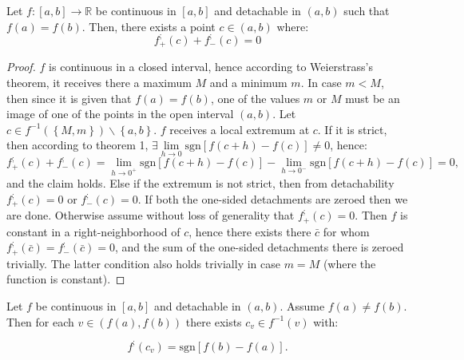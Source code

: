 \documentclass[11pt]{book}
\begin{document}
\begin{theorem}Let $f:\left[a,b\right]\rightarrow\mathbb{R}$ be continuous in $\left[a,b\right]$ and detachable in $\left(a,b\right)$ such that $f\left(a\right)=f\left(b\right).$ Then, there exists a point $c\in\left(a,b\right)$ where:
$$f_{+}^{;}\left(c\right)+f_{-}^{;}\left(c\right)=0$$
\label{rolle_theorem_detachment}
\end{theorem}
\begin{proof}$f$ is continuous in a closed interval, hence according to Weierstrass’s theorem, it receives there a maximum $M$ and a minimum $m$. In case $m < M$, then since it is given that $f\left(a\right)=f\left(b\right)$, one of the values $m$ or $M$ must be an image of one of the points in the open interval $\left(a,b\right)$. Let $c\in f^{-1}\left(\left\{ M,m\right\} \right)\backslash\left\{ a,b\right\}$. $f$ receives a local extremum at $c$. If it is strict, then according to theorem 1, $\exists\underset{h\rightarrow0}{\lim}\text{sgn}\left[f\left(c+h\right)-f\left(c\right)\right]\neq0$, hence:
$$f_{+}^{;}\left(c\right)+f_{-}^{;}\left(c\right)=\underset{{\scriptscriptstyle h\rightarrow0^{+}}}{\lim}\text{sgn}\left[f\left(c+h\right)-f\left(c\right)\right]-\underset{{\scriptscriptstyle h\rightarrow0^{-}}}{\lim}\text{sgn}\left[f\left(c+h\right)-f\left(c\right)\right]=0,$$and the claim holds. Else if the extremum is not strict, then from detachability $f_{+}^{;}\left(c\right)=0$ or $f_{-}^{;}\left(c\right)=0$. If both the one-sided detachments are zeroed then we are done. Otherwise assume without loss of generality that $f_{+}^{;}\left(c\right)=0$. Then $f$ is constant in a right-neighborhood of $c$, hence there exists there $\bar{c}$ for whom $f_{+}^{;}\left(\bar{c}\right)=f_{-}^{;}\left(\bar{c}\right)=0$, and the sum of the one-sided detachments there is zeroed trivially. The latter condition also holds trivially in case $m=M$ (where the function is constant).
\end{proof}

\begin{theorem}Let $f$ be continuous in $\left[a,b\right]$ and detachable in $\left(a,b\right)$. Assume $f\left(a\right)\neq f\left(b\right).$ Then for each $v\in\left(f\left(a\right),f\left(b\right)\right)$ there exists $c_{v}\in f^{-1}\left(v\right)$ with:

$$f^{;}\left(c_{v}\right)=\text{sgn}\left[f\left(b\right)-f\left(a\right)\right].$$
\label{mvt_detachment_thm}
\end{theorem}
\end{document}
